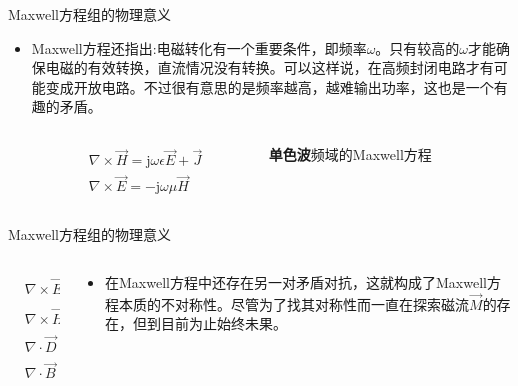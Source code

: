\begin{frame}{Maxwell方程组的物理意义}
 \begin{itemize}
  \item Maxwell方程还指出:电磁转化有一个重要条件，即频率$\omega$。只有较高的$\omega$才能确保电磁的有效转换，直流情况没有转换。可以这样说，在高频封闭电路才有可能变成开放电路。不过很有意思的是频率越高，越难输出功率，这也是一个有趣的矛盾。
        \begin{columns}
         \begin{column}{0.4\linewidth}
          \begin{align*}
            & \nabla\times\vec{H} = \mathrm{j}\omega\epsilon\vec{E}+\vec{J} \\
            & \nabla\times\vec{E} = -\mathrm{j}\omega\mu\vec{H}
          \end{align*}
         \end{column}
         \begin{column}{0.6\linewidth}
          \textbf{单色波}频域的Maxwell方程
         \end{column}
        \end{columns}
 \end{itemize}
\end{frame}

\begin{frame}{Maxwell方程组的物理意义}
 \begin{columns}
  \begin{column}{0.4\linewidth}
   \begin{align*}
     & \nabla\times\vec E=-\frac{\partial \vec B}{\partial t}         \\
     & \nabla\times\vec H=\vec{J} +\frac{\partial \vec D}{\partial t} \\
     & \nabla\cdot\vec{D}=\rho                                        \\
     & \nabla\cdot\vec{B}=0
   \end{align*}
  \end{column}
  \begin{column}{0.65\linewidth}
   \begin{itemize}
    \item 在Maxwell方程中还存在另一对矛盾对抗，这就构成了Maxwell方程本质的不对称性。尽管为了找其对称性而一直在探索磁流$\vec{M}$的存在，但到目前为止始终未果。
   \end{itemize}
  \end{column}
 \end{columns}
\end{frame}

